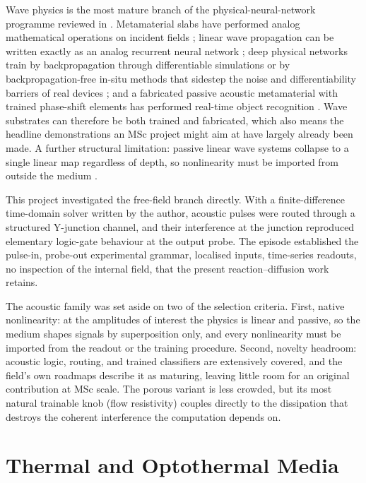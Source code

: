 Wave physics is the most mature branch of the physical-neural-network programme reviewed in . Metamaterial slabs have performed analog mathematical operations on incident fields \cite{silva2014performing}; linear wave propagation can be written exactly as an analog recurrent neural network \cite{hughes2019wave}; deep physical networks train by backpropagation through differentiable simulations \cite{wright2022deep} or by backpropagation-free in-situ methods that sidestep the noise and differentiability barriers of real devices \cite{momeni2023backpropagation}; and a fabricated passive acoustic metamaterial with trained phase-shift elements has performed real-time object recognition \cite{weng2020meta}. Wave substrates can therefore be both trained and fabricated, which also means the headline demonstrations an MSc project might aim at have largely already been made. A further structural limitation: passive linear wave systems collapse to a single linear map regardless of depth, so nonlinearity must be imported from outside the medium \cite{mcmahon2024nonlinear}.

This project investigated the free-field branch directly. With a finite-difference time-domain solver written by the author, acoustic pulses were routed through a structured Y-junction channel, and their interference at the junction reproduced elementary logic-gate behaviour at the output probe. The episode established the pulse-in, probe-out experimental grammar, localised inputs, time-series readouts, no inspection of the internal field, that the present reaction--diffusion work retains.

The acoustic family was set aside on two of the selection criteria. First, native nonlinearity: at the amplitudes of interest the physics is linear and passive, so the medium shapes signals by superposition only, and every nonlinearity must be imported from the readout or the training procedure. Second, novelty headroom: acoustic logic, routing, and trained classifiers are extensively covered, and the field's own roadmaps describe it as maturing, leaving little room for an original contribution at MSc scale. The porous variant is less crowded, but its most natural trainable knob (flow resistivity) couples directly to the dissipation that destroys the coherent interference the computation depends on.

\section{Thermal and Optothermal Media}
\label{sec:sub_thermal}

